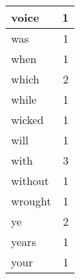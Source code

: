 \begin{center}
\begin{longtable}{l|r}
voice & 1 \\ \hline
was & 1 \\ \hline
when & 1 \\ \hline
which & 2 \\ \hline
while & 1 \\ \hline
wicked & 1 \\ \hline
will & 1 \\ \hline
with & 3 \\ \hline
without & 1 \\ \hline
wrought & 1 \\ \hline
ye & 2 \\ \hline
years & 1 \\ \hline
your & 1 \\ \hline
\end{longtable}
\end{center}



\normalsize



